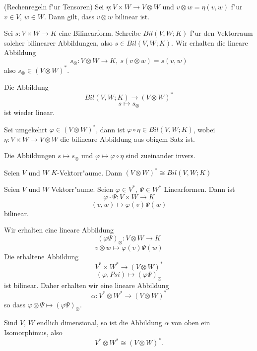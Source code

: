 \documentclass[11pt, a4paper]{article}
\begin{document}
\begin{remark} (Rechenregeln f"ur Tensoren)
Sei $\eta: V \times W \rightarrow V \otimes W$ und $v \otimes w = \eta(v,w)$ f"ur $v \in V$, $w \in W$. Dann gilt, dass $v \otimes w$ bilinear ist.
\end{remark}

\begin{example}
Sei $s : V \times W \rightarrow K$ eine Bilinearform. Schreibe $Bil(V, W; K)$ f"ur den Vektorraum solcher bilinearer Abbildungen, also $s \in Bil(V, W; K)$.
Wir erhalten die lineare Abbildung 
$$
s_\otimes: V \otimes W \rightarrow K, \ s(v \otimes w) = s(v, w)
$$
also $s_\otimes \in (V \otimes W)^*$. 

Die Abbildung 
$$
Bil(V, W; K) \rightarrow (V \otimes W)^*
$$
$$
s \mapsto s_\otimes
$$
ist wieder linear.

Sei umgekehrt $\varphi \in (V \otimes W)^*$, dann ist $\varphi \circ \eta \in Bil(V, W; K)$, wobei $\eta: V \times W \rightarrow V \otimes W$ die bilineare Abbildung aus obigem Satz ist.

Die Abbildungen $s \mapsto s_\otimes$ und $ \varphi \mapsto \varphi \circ \eta $
sind zueinander invers.
\end{example}

\begin{theorem}
Seien $V$ und $W$ $K$-Vektorr"aume. Dann $(V \otimes W)^* \cong Bil(V, W; K)$
\end{theorem}

\begin{example}
Seien $V$ und $W$ Vektorr"aume.
Seien $\varphi \in V^*$, $\Psi \in W^*$ Linearformen.
Dann ist 
$$
\varphi \cdot \Psi: V \times W \rightarrow K
$$
$$
(v, w) \mapsto \varphi (v) \Psi(w)
$$
bilinear.

Wir erhalten eine lineare Abbildung
$$
(\varphi \Psi)_\otimes : V \otimes W \rightarrow K
$$
$$
v \otimes w \mapsto \varphi (v) \Psi(w)
$$
Die erhaltene Abbildung
$$
V^* \times W^* \rightarrow (V \otimes W)^*
$$
$$
(\varphi, Psi) \mapsto (\varphi \Psi)_\otimes
$$
ist bilinear.
Daher erhalten wir eine lineare Abbildung
$$
\alpha: V^* \otimes W^* \rightarrow (V \otimes W)^*
$$
so dass $\varphi \otimes \Psi \mapsto (\varphi \Psi)_\otimes$.

\end{example}


\begin{theorem}
Sind $V$, $W$ endlich dimensional, so ist die Abbildung $\alpha$ von oben ein Isomorphimus, also 
$$
V^* \otimes W^* \cong (V \otimes W)^*.
$$
\end{theorem}
\end{document}
